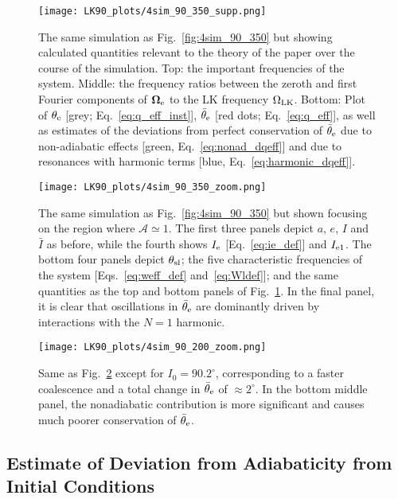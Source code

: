 \documentclass[
        twocolumn,
        twocolappendix
    ]{aastex63}
\renewcommand*{\bm}[1]{\boldsymbol{\mathbf{#1}}}
\begin{document}
\begin{figure}
    \centering
    \texttt{[image: LK90\_plots/4sim\_90\_350\_supp.png]}
    \caption{The same simulation as Fig.~\ref{fig:4sim_90_350} but showing
    calculated quantities relevant to the theory of the paper over the course of
    the simulation. Top: the important frequencies of the system. Middle: the
    frequency ratios between the zeroth and first Fourier components of
    $\bm{\Omega}_{\rm e}$ to the LK frequency $\Omega_{\rm LK}$. Bottom: Plot of
    $\theta_{\rm e}$ [grey; Eq.~\eqref{eq:q_eff_inst}], $\bar{\theta}_{\rm e}$
    [red dots; Eq.~\eqref{eq:q_eff}], as well as estimates of the deviations from
    perfect conservation of $\bar{\theta}_{\rm e}$ due to non-adiabatic effects
    [green, Eq.~\eqref{eq:nonad_dqeff}] and due to resonances with harmonic
    terms [blue, Eq.~\eqref{eq:harmonic_dqeff}].}\label{fig:4sim_90_350_supp}
\end{figure}
\begin{figure*}
    \centering
    \texttt{[image: LK90\_plots/4sim\_90\_350\_zoom.png]}
    \caption{The same simulation as Fig.~\ref{fig:4sim_90_350} but shown
    focusing on the region where $\mathcal{A} \simeq 1$. The first three panels
    depict $a$, $e$, $I$ and $\bar{I}$ as before, while the fourth shows $I_{\rm
    e}$ [Eq.~\eqref{eq:ie_def}] and $I_{\rm e1}$. The bottom four panels depict
    $\theta_{\rm sl}$; the five characteristic frequencies of the system
    [Eqs.~\ref{eq:weff_def} and~\eqref{eq:Wldef}]; and the same quantities as
    the top and bottom panels of Fig.~\ref{fig:4sim_90_350_supp}. In the final
    panel, it is clear that oscillations in $\bar{\theta}_{\rm e}$ are
    dominantly driven by interactions with the $N = 1$
    harmonic.}\label{fig:4sim_90_350_zoom}
\end{figure*}

\begin{figure*}
    \centering
    \texttt{[image: LK90\_plots/4sim\_90\_200\_zoom.png]}
    \caption{Same as Fig.~\ref{fig:4sim_90_350_zoom} except for $I_0 =
    90.2^\circ$, corresponding to a faster coalescence and a total change in
    $\bar{\theta}_{\rm e}$ of $\approx 2^\circ$. In the bottom middle panel, the
    nonadiabatic contribution is more significant and causes much poorer
    conservation of $\bar{\theta}_{\rm e}$.}\label{fig:4sim_90_200_zoom}
\end{figure*}

\subsection{Estimate of Deviation from Adiabaticity from Initial Conditions}
\end{document}
